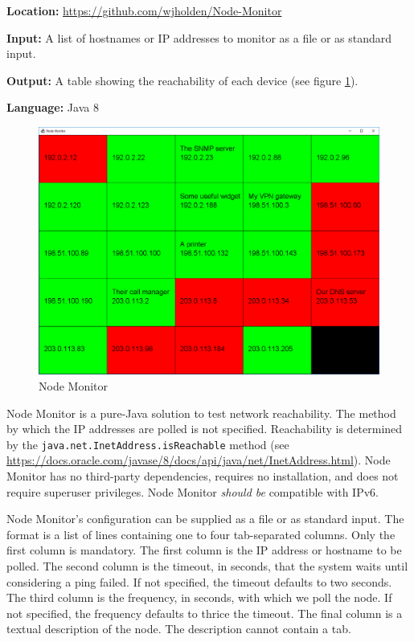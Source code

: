 \documentclass[12pt]{article}
\begin{document}
\noindent \textbf{Location:} \url{https://github.com/wjholden/Node-Monitor}

\noindent \textbf{Input:} A list of hostnames or IP addresses to monitor as a file or as standard input.

\noindent \textbf{Output:} A table showing the reachability of each device (see figure \ref{fig:Node-Monitor}).

\noindent \textbf{Language:} Java 8

\begin{figure}[h]
\centering
\includegraphics[width=.80\textwidth]{Node-Monitor}
\caption{Node Monitor}
\label{fig:Node-Monitor}
\end{figure}

Node Monitor is a pure-Java solution to test network reachability.
The method by which the IP addresses are polled is not specified.
Reachability is determined by the \texttt{java.net.InetAddress.isReachable} method (see \url{https://docs.oracle.com/javase/8/docs/api/java/net/InetAddress.html}).
Node Monitor has no third-party dependencies, requires no installation, and does not require superuser privileges.
Node Monitor \textit{should be} compatible with IPv6.

Node Monitor's configuration can be supplied as a file or as standard input.
The format is a list of lines containing one to four tab-separated columns.
Only the first column is mandatory.
The first column is the IP address or hostname to be polled.
The second column is the timeout, in seconds, that the system waits until considering a ping failed.
If not specified, the timeout defaults to two seconds.
The third column is the frequency, in seconds, with which we poll the node.
If not specified, the frequency defaults to thrice the timeout.
The final column is a textual description of the node.
The description cannot contain a tab.
\end{document}
